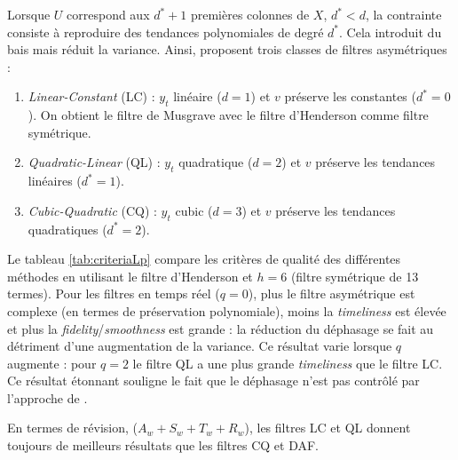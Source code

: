 \documentclass[
  12pt,
  a4paper,french]{article}
\newcommand\1{\mathds{1}}
\begin{document}
Lorsque \(U\) correspond aux \(d^*+1\) premières colonnes de \(X\), \(d^*<d\), la contrainte consiste à reproduire des tendances polynomiales de degré \(d^*\).
Cela introduit du bais mais réduit la variance.
Ainsi, \textcite{proietti2008} proposent trois classes de filtres asymétriques :

\begin{enumerate}
\def\labelenumi{\arabic{enumi}.}
\item
  \emph{Linear-Constant} (LC) : \(y_t\) linéaire (\(d=1\)) et \(v\) préserve les constantes (\(d^*=0\)).
  On obtient le filtre de Musgrave avec le filtre d'Henderson comme filtre symétrique.
\item
  \emph{Quadratic-Linear} (QL) : \(y_t\) quadratique (\(d=2\)) et \(v\) préserve les tendances linéaires (\(d^*=1\)).
\item
  \emph{Cubic-Quadratic} (CQ) : \(y_t\) cubic (\(d=3\)) et \(v\) préserve les tendances quadratiques (\(d^*=2\)).
\end{enumerate}

Le tableau \ref{tab:criteriaLp} compare les critères de qualité des différentes méthodes en utilisant le filtre d'Henderson et \(h=6\) (filtre symétrique de 13 termes).
Pour les filtres en temps réel (\(q=0\)), plus le filtre asymétrique est complexe (en termes de préservation polynomiale), moins la \emph{timeliness} est élevée et plus la \emph{fidelity}/\emph{smoothness} est grande : la réduction du déphasage se fait au détriment d'une augmentation de la variance.
Ce résultat varie lorsque \(q\) augmente : pour \(q=2\) le filtre QL a une plus grande \emph{timeliness} que le filtre LC.
Ce résultat étonnant souligne le fait que le déphasage n'est pas contrôlé par l'approche de \textcite{proietti2008}.

En termes de révision, (\(A_w+S_w+T_w+R_w\)), les filtres LC et QL donnent toujours de meilleurs résultats que les filtres CQ et DAF.
\end{document}
